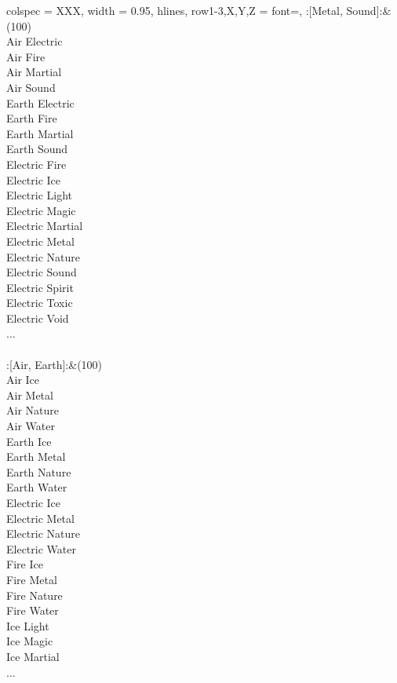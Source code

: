 \begin{longtblr}[
	caption = {2v2 Defending Weak},
	label = {2v2-Defending-Weak},
]{
	colspec = {XXX}, width = 0.95\linewidth,
	hlines,
	row{1-3,X,Y,Z} = {font=\bfseries},
}
	:[Metal, Sound]:&{(100)\\
	Air Electric \\
	Air Fire \\
	Air Martial \\
	Air Sound \\
	Earth Electric \\
	Earth Fire \\
	Earth Martial \\
	Earth Sound \\
	Electric Fire \\
	Electric Ice \\
	Electric Light \\
	Electric Magic \\
	Electric Martial \\
	Electric Metal \\
	Electric Nature \\
	Electric Sound \\
	Electric Spirit \\
	Electric Toxic \\
	Electric Void \\
	...\\
	}\\

	:[Air, Earth]:&{(100)\\
	Air Ice \\
	Air Metal \\
	Air Nature \\
	Air Water \\
	Earth Ice \\
	Earth Metal \\
	Earth Nature \\
	Earth Water \\
	Electric Ice \\
	Electric Metal \\
	Electric Nature \\
	Electric Water \\
	Fire Ice \\
	Fire Metal \\
	Fire Nature \\
	Fire Water \\
	Ice Light \\
	Ice Magic \\
	Ice Martial \\
	...\\
	}\\


\end{longtblr}
